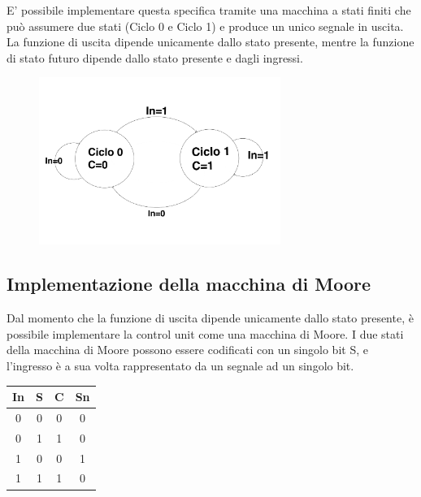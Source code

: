 \documentclass[10pt]{article}
\begin{document}
\begin{itemize}
E' possibile implementare questa specifica tramite una macchina a stati finiti che può assumere due stati (Ciclo 0 e Ciclo 1) e produce un unico segnale in uscita. 
La funzione di uscita dipende unicamente dallo stato presente, mentre la funzione di stato futuro dipende dallo stato presente e dagli ingressi.

\begin{figure}[H]
    \centering
    \includegraphics[width=0.7\textwidth]{statediag}
\end{figure}


\subsection{Implementazione della macchina di Moore}
Dal momento che la funzione di uscita dipende unicamente dallo stato presente, è possibile implementare la control unit come una macchina di Moore.
I due stati della macchina di Moore possono essere codificati con un singolo bit S, e l'ingresso è a sua volta rappresentato da un segnale ad un singolo bit.
\begin{table}[H]
    \begin{minipage}[c]{\textwidth}
    \centering
    \begin{tabular}{|c|c|c|c|}
        \hline
        \textbf{In} &\textbf{S}  & \textbf{C} & \textbf{Sn} \\ \hline
        0           &0           & 0          & 0           \\
        0           &1           & 1          & 0           \\
        1           &0           & 0          & 1           \\ 
        1           &1           & 1          & 0           \\ \hline
        \end{tabular}
    \end{minipage}
    \end{table}


\end{itemize}
\end{document}
